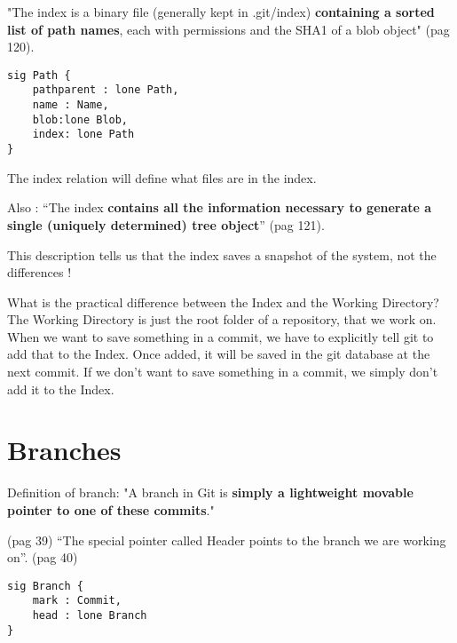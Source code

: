 "The index is a binary file (generally kept in .git/index) 
{\bf containing a sorted list of path names}, each with permissions and the
SHA1 of a blob object" \cite{gitComm} (pag 120). \par 

\begin{lstlisting}
sig Path {
	pathparent : lone Path,
	name : Name,
	blob:lone Blob,
	index: lone Path
}
\end{lstlisting}

The index relation will define what files are in the index. \par 

Also : ``The index {\bf contains all the information necessary to generate a single
(uniquely determined) tree object}'' \cite{gitComm} (pag 121). \par
This description tells us that the index saves a snapshot of the system,
not the differences !

What is the practical difference between the Index and the Working
Directory? The Working Directory is just the root folder of a repository,
that we work on. When we want to save something in a commit, we have to explicitly 
tell git to add that to the Index. Once added, it
will be saved in the git database at the next commit. If we don't want to save
something in a commit, we simply don't add it to the Index.


\section{Branches}
Definition of branch: "A branch in Git is {\bf simply a 
lightweight movable pointer to one of these commits}." \par \cite{progit} 
(pag 39)
``The special pointer called Header 
points to the branch we are working on''. \cite{progit} (pag 40)

\begin{lstlisting}
sig Branch {
	mark : Commit,
	head : lone Branch
}
\end{lstlisting}

